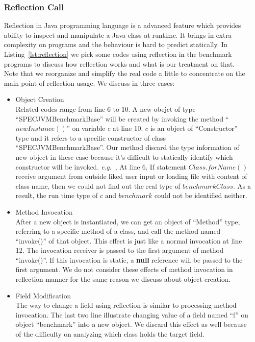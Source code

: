 \documentclass{fac}
\newcommand\eg{\textit{e.g.\ }}
\begin{document}
\subsubsection{Reflection Call}\label{subsubsec:reflection-call}
Reflection in Java programming language is a advanced feature which provides ability to inspect and manipulate a Java class at runtime. It brings in extra complexity on programs and the behaviour is hard to predict statically. In Listing~\ref{lst:reflection} we pick some codes using reflection in the benchmark programs to discuss how reflection works and what is our treatment on that. Note that we reorganize and simplify the real code a little to concentrate on the main point of reflection usage. We discuss in three cases:
\begin{itemize}
\item Object Creation \\
Related codes range from line 6 to 10. A new obejct of type ``SPECJVMBenchmarkBase'' will be created by invoking the method ``$newInstance()$'' on variable $c$ at line 10. $c$ is an object of ``Constructor'' type and it refers to a specific constructor of class ``SPECJVMBenchmarkBase''. Our method discard the type information of new object in these case because it's difficult to statically identify which constructor will be invoked. \eg, At line 6, If statement $Class.forName()$ receive argument from outside liked user input or loading file with content of class name, then we could not find out the real type of $benchmarkClass$. As a result, the run time type of $c$ and $benchmark$ could not be identified neither.
\item Method Invocation\\
After a new object is instantiated, we can get an object of ``Method'' type, referring to a specific method of a class, and call the method named ``invoke()'' of that object. This effect is just like a normal invocation at line 12. The invocation receiver is passed to the first argument of method ``invoke()''. If this invocation is static, a \textbf{null} reference will be passed to the first argument. We do not consider these effects of method invocation in reflection manner for the same reason we discuss about object creation.
\item Field Modification\\
The way to change a field using reflection is similar to processing method invocation. The last two line illustrate changing value of a field named ``f'' on object ``benchmark'' into a new object. We discard this effect as well because of the difficulty on analyzing which class holds the target field.
\end{itemize}
\end{document}
